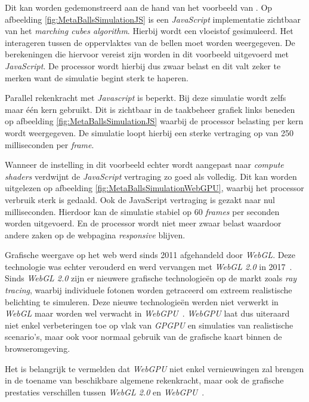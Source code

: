 \bigbreak{}

Dit kan worden gedemonstreerd aan de hand van het voorbeeld van \textcite{Jones2023}. Op afbeelding \ref{fig:MetaBallsSimulationJS} is een \textit{JavaScript} implementatie zichtbaar van het \textit{marching cubes algorithm}. Hierbij wordt een vloeistof gesimuleerd. Het interageren tussen de oppervlaktes van de bellen moet worden weergegeven. De berekeningen die hiervoor vereist zijn worden in dit voorbeeld uitgevoerd met \textit{JavaScript}. De processor wordt hierbij dus zwaar belast en dit valt zeker te merken want de simulatie begint sterk te haperen. 

\bigbreak{}

Parallel rekenkracht met \textit{Javascript} is beperkt. Bij deze simulatie wordt zelfs maar één kern gebruikt. Dit is zichtbaar in de taakbeheer grafiek links beneden op afbeelding \ref{fig:MetaBallsSimulationJS} waarbij de processor belasting per kern wordt weergegeven. De simulatie loopt hierbij een sterke vertraging op van 250 milliseconden per \textit{frame}.

\bigbreak{}

Wanneer de instelling in dit voorbeeld echter wordt aangepast naar \textit{compute shaders} verdwijnt de \textit{JavaScript} vertraging zo goed als volledig. Dit kan worden uitgelezen op afbeelding \ref{fig:MetaBallsSimulationWebGPU}, waarbij het processor verbruik sterk is gedaald. Ook de JavaScript vertraging is gezakt naar nul milliseconden. Hierdoor kan de simulatie stabiel op 60 \textit{frames} per seconden worden uitgevoerd. En de processor wordt niet meer zwaar belast waardoor andere zaken op de webpagina \textit{responsive} blijven.

\bigbreak{}
Grafische weergave op het web werd sinds 2011 afgehandeld door \textit{WebGL}. Deze technologie was echter verouderd en werd vervangen met \textit{WebGL 2.0} in 2017~\autocite{Surma2022}. Sinds \textit{WebGL 2.0} zijn er nieuwere grafische technologieën op de markt zoals \textit{ray tracing}, waarbij individuele fotonen worden getraceerd om extreem realistische belichting te simuleren. Deze nieuwe technologieën werden niet verwerkt in \textit{WebGL} maar worden wel verwacht in \textit{WebGPU}~\autocite{Surma2022}. \textit{WebGPU} laat dus uiteraard niet enkel verbeteringen toe op vlak van \textit{GPGPU} en simulaties van realistische scenario's, maar ook voor normaal gebruik van de grafische kaart binnen de browseromgeving.

\bigbreak{}

Het is belangrijk te vermelden dat \textit{WebGPU} niet enkel vernieuwingen zal brengen in de toename van beschikbare algemene rekenkracht, maar ook de grafische prestaties verschillen tussen \textit{WebGL 2.0} en \textit{WebGPU}~\autocite{Wallez2023}. 